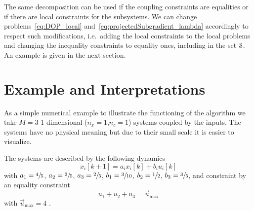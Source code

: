 \documentclass[../main.tex]{subfiles}
\begin{document}
\begin{remark}
  The same decomposition can be used if the coupling constraints are equalities or if there are local constraints for the subsystems.
  We can change problems~\eqref{eq:DOP_local} and~\eqref{eq:projectedSubgradient_lambda} accordingly to respect such modifications, i.e.\ adding the local constraints to the local problems and changing the inequality constraints to equality ones, including in the set $\mathcal{S}$.
  An example is given in the next section.
\end{remark}

\section{Example and Interpretations}\label{sec:example-interpr}
As a simple numerical example to illustrate the functioning of the algorithm we take $M=3$ \mbox{$1$-dimensional} \siso{} ($n_{x}=1$,$n_{c}=1$) systems coupled by the inputs.
The systems have no physical meaning but due to their small scale it is easier to visualize.

The systems are described by the following \ltidt{} dynamics
\begin{equation}
  \label{eq:example_dynamics}
  x_{i}[k+1]=a_{i}x_{i}[k]+b_{i}u_{i}[k]
\end{equation}
with
$a_1=\sfrac{4}{5}$, $a_2=\sfrac{3}{5}$, $a_3=\sfrac{2}{5}$, $b_1=\sfrac{3}{10}$, $b_2=\sfrac{1}{2}$, $b_3=\sfrac{3}{5}$,
and
constraint by an equality constraint
\begin{equation}
  \label{eq:example_equality}
  u_{1}+u_{2}+u_{3}=\vec{u}_{\max}
\end{equation}
with
$\vec{u}_{\max}=4$
.
\end{document}
